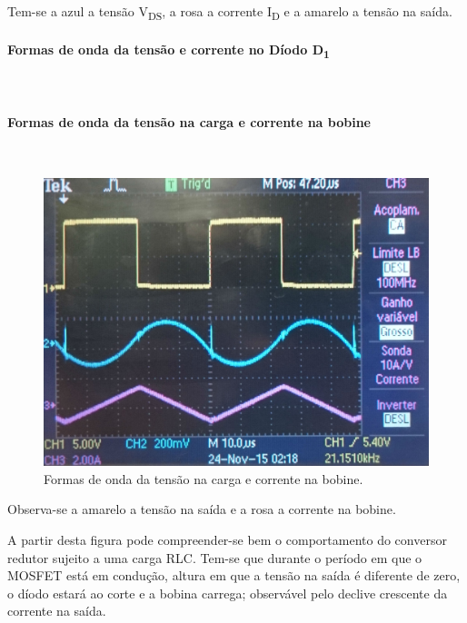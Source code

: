 \documentclass[a4paper,11pt]{article}
\numberwithin{equation}{section}
\begin{document}

Tem-se a azul a tensão V\textsubscript{DS}, a rosa a corrente I\textsubscript{D} e a amarelo a tensão na saída.



\paragraph{Formas de onda da tensão e corrente no Díodo D\textsubscript{1}}\mbox{}\

\paragraph{Formas de onda da tensão na carga e corrente na bobine}\mbox{}\

\begin{figure}[H]
	\centering
	\includegraphics[keepaspectratio=true, scale=0.15]{img/figs/tensao_carga_corrente_bobine_ac_rlcbuck}
	\caption{Formas de onda da tensão na carga e corrente na bobine.}
	\label{fig:tensao_carga_corrente_bobine_ac_rlcbuck}
	\vspace{-0.8em}
\end{figure} 


Observa-se a amarelo a tensão na saída e a rosa a corrente na bobine.

A partir desta figura pode compreender-se bem o comportamento do conversor redutor sujeito a uma carga RLC. Tem-se que durante o período em que o MOSFET está em condução, altura em que a tensão na saída é diferente de zero, o díodo estará ao corte e a bobina carrega; observável pelo declive crescente da corrente na saída. 
\end{document}
